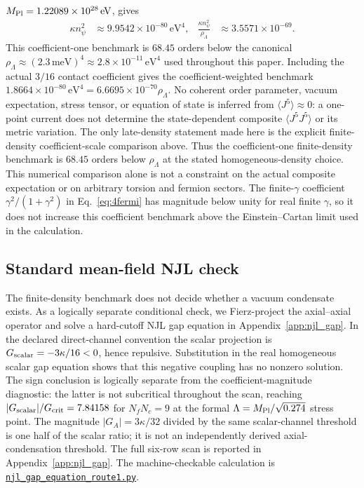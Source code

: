 \documentclass[aps,prd,twocolumn,superscriptaddress,showpacs,preprintnumbers,nofootinbib,longbibliography,floatfix]{revtex4-2}
\newcommand{\MPl}{M_{\rm Pl}}
\newcommand{\artifactnamed}[2]{\href{https://github.com/Hubify-Projects/bigbounce/blob/main/#1}{\nolinkurl{#2}}}
\begin{document}
$\MPl=1.22089\times10^{28}\,\text{eV}$, gives
\begin{align}
\kappa n_\psi^2 &\approx 9.9542\times10^{-80}\,\text{eV}^4,
&\frac{\kappa n_\psi^2}{\rho_\Lambda}&\approx3.5571\times10^{-69}.
\end{align}
This coefficient-one benchmark is $68.45$ orders below the canonical
$\rho_\Lambda\approx (2.3\,\text{meV})^4 \approx 2.8\times 10^{-11}\,\text{eV}^4$
used throughout this paper.  Including the actual $3/16$ contact coefficient
gives the coefficient-weighted benchmark
$1.8664\times10^{-80}\,\text{eV}^4=6.6695\times10^{-70}\rho_\Lambda$.
No coherent order parameter, vacuum expectation, stress tensor, or equation of
state is inferred from $\langle J^5\rangle\approx0$: a one-point current does
not determine the state-dependent composite $\langle J^5J^5\rangle$ or its
metric variation.  The only late-density statement made here is the explicit
finite-density coefficient-scale comparison above.
Thus the coefficient-one finite-density benchmark is $68.45$ orders below
$\rho_\Lambda$ at the stated homogeneous-density choice.  This numerical
comparison alone is not a constraint on the actual composite expectation or
on arbitrary torsion and fermion sectors.  The finite-$\gamma$ coefficient
$\gamma^2/(1+\gamma^2)$ in Eq.~\eqref{eq:4fermi} has magnitude below unity for
real finite $\gamma$, so it does not increase this coefficient benchmark above
the Einstein--Cartan limit used in the calculation.

\subsection{Standard mean-field NJL check}

The finite-density benchmark does not decide whether a vacuum condensate
exists.  As a logically separate conditional check, we Fierz-project the
axial--axial operator and solve a
hard-cutoff NJL gap equation in Appendix~\ref{app:njl_gap}.  In the declared
direct-channel convention the scalar projection is
$G_{\rm scalar}=-3\kappa/16<0$, hence repulsive.  Substitution in the real
homogeneous scalar gap equation shows that this negative coupling has no
nonzero solution.  The sign conclusion is logically separate from the
coefficient-magnitude diagnostic: the latter is not subcritical throughout
the scan, reaching $|G_{\rm scalar}|/G_{\rm crit}=7.84158$ for
$N_fN_c=9$ at the formal $\Lambda=M_{\rm Pl}/\sqrt{0.274}$ stress point.
The magnitude $|G_A|=3\kappa/32$ divided by the same scalar-channel threshold
is one half of the scalar ratio; it is not an independently derived
axial-condensation threshold.  The full six-row scan is reported in
Appendix~\ref{app:njl_gap}.
The machine-checkable calculation is
\artifactnamed{arxiv/scripts/njl_gap_equation_route1.py}{njl_gap_equation_route1.py}.
\end{document}
